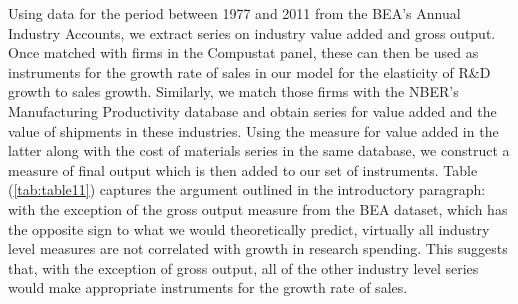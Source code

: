 \documentclass{_latex/house}
\begin{document}
Using data for the period between 1977 and 2011 from the BEA's Annual Industry Accounts, we extract series on industry value added and gross output. Once matched with firms in the Compustat panel, these can then be used as instruments for the growth rate of sales in our model for the elasticity of R\&D growth to sales growth. Similarly, we match those firms with the NBER's Manufacturing Productivity database and obtain series for value added and the value of shipments in these industries. Using the measure for value added in the latter along with the cost of materials series in the same database, we construct a measure of final output which is then added to our set of instruments. Table (\ref{tab:table11}) captures the argument outlined in the introductory paragraph: with the exception of the gross output measure from the BEA dataset,  which has the opposite sign to what we would theoretically predict, virtually all industry level measures are not correlated with growth in research spending. This suggests that, with the exception of gross output, all of the other industry level series would make appropriate instruments for the growth rate of sales. 
\end{document}
